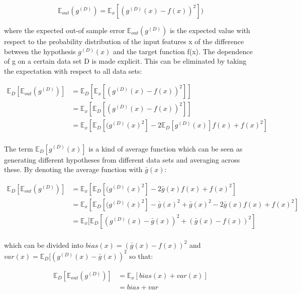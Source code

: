 \begin{equation*}
\mathbb{E}_{out}(g^{(D)}) = \mathbb{E}_x[(g^{(D)}(x)-f(x))^2])
\label{eqn:squared}
\end{equation*}

where the expected out-of sample error $\mathbb{E}_{out}(g^{(D)})$ is the expected value with respect to the probability distribution of the input features x of the difference between the hypothesis $g^{(D)}(x)$ and the target function f(x). The dependence of g on a certain data set D is made explicit. This can be eliminated by taking the expectation with respect to all data sets:

\begin{equation*}\label{eqn:bv}
\begin{split}
\mathbb{E}_D [ \mathbb{E}_{out}(g^{(D)}) ] 
 & = \mathbb{E}_D [ \mathbb{E}_x[(g^{(D)}(x)-f(x))^2] ]\\
 & = \mathbb{E}_x [ \mathbb{E}_D[(g^{(D)}(x)-f(x))^2] ]\\
 & = \mathbb{E}_x [ \mathbb{E}_D[(g^{(D)}(x)^2]-2\mathbb{E}_D[g^{(D)}(x)]f(x)+f(x)^2]\\
\end{split}
\end{equation*}

The term $\mathbb{E}_D[g^{(D)}(x)]$ is a kind of average function which can be seen as generating different hypotheses from different data sets and averaging across these. By denoting the average function with $\bar{g}(x)$:

\begin{equation*}\label{eqn:bv2}
\begin{split}
\mathbb{E}_D [ \mathbb{E}_{out}(g^{(D)}) ] 
 & = \mathbb{E}_x [ \mathbb{E}_D[(g^{(D)}(x)^2]-2\bar{g}(x)f(x)+f(x)^2]\\
 & = \mathbb{E}_x [ \mathbb{E}_D[(g^{(D)}(x)^2]-\bar{g}(x)^2+\bar{g}(x)^2-2\bar{g}(x)f(x)+f(x)^2]\\
 & = \mathbb{E}_x [ \mathbb{E}_D[(g^{(D)}(x)-\bar{g}(x))^2 + (\bar{g}(x)-f(x))^2]\\
\end{split}
\end{equation*}
 
which can be divided into $bias(x) = (\bar{g}(x)-f(x))^2$ and $var(x) = \mathbb{E}_D[(g^{(D)}(x)-\bar{g}(x))^2$ so that:

\begin{equation*}\label{eqn:bv3}
\begin{split}
\mathbb{E}_D [ \mathbb{E}_{out}(g^{(D)}) ] 
 & = \mathbb{E}_x [ bias(x) + var(x)]\\
 & = bias + var
\end{split}
\end{equation*}

